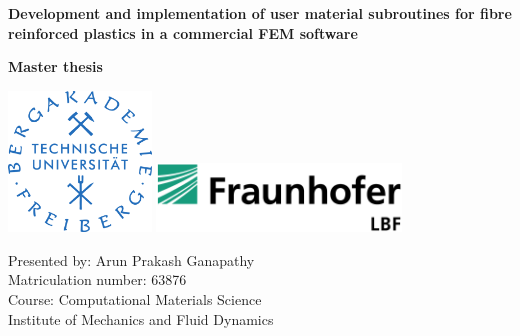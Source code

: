 \begin{titlepage}
	
	\begin{center}
	  	
	  	\vspace*{0.4cm}
	  	
	  	\Large{ \textbf{Development and implementation of user material subroutines for fibre reinforced plastics in a commercial FEM software} }
	  	
	  	\vspace{0.5cm}
	  	
	  	\Large{ \textbf{Master thesis}}
	  	
	  	\vspace{1cm}
	  	
	 \begin{center} \hspace*{0.8cm}	\includegraphics[width=38mm]{logo.png} \hspace*{0.8cm} \vspace{1cm} \centering \includegraphics[width=65mm]{lbf.png} \end{center}
	
	   \vspace{0.5cm}
	   
	 \large { Presented by: Arun Prakash Ganapathy }\\
	  \large { Matriculation number: 63876 } \\
	  \large{Course: Computational Materials Science } \\
	    \large{Institute of Mechanics and Fluid Dynamics}\\
	    	\vspace{1.5cm}
	    	
   \begin{tabular}{l l}


\end{tabular}
\end{center}
\end{titlepage}
